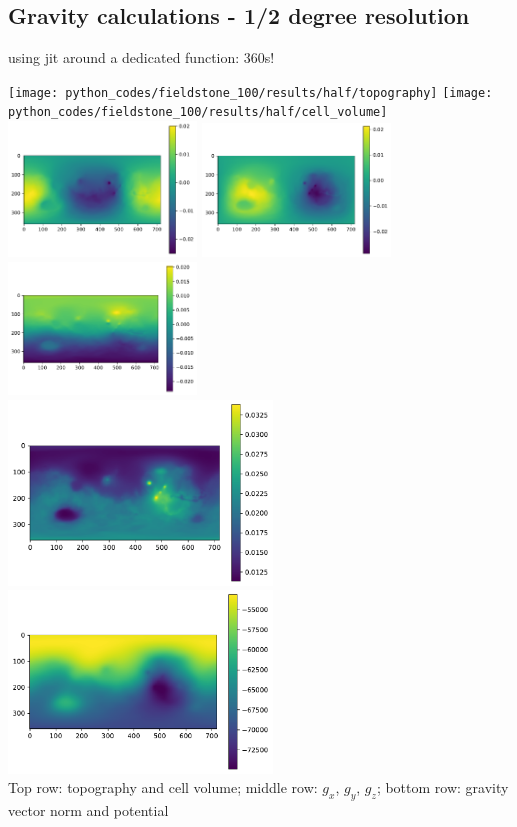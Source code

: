 \newpage
\subsection*{Gravity calculations - 1/2 degree resolution}

using jit around a dedicated function: 360s!

\begin{center}
\texttt{[image: python\_codes/fieldstone\_100/results/half/topography]}
\texttt{[image: python\_codes/fieldstone\_100/results/half/cell\_volume]}\\
\includegraphics[width=5cm]{python_codes/fieldstone_100/results/half/gx}
\includegraphics[width=5cm]{python_codes/fieldstone_100/results/half/gy}
\includegraphics[width=5cm]{python_codes/fieldstone_100/results/half/gz}\\
\includegraphics[width=7cm]{python_codes/fieldstone_100/results/half/gg}
\includegraphics[width=7cm]{python_codes/fieldstone_100/results/half/UU}\\
{\captionfont Top row: topography and cell volume; middle row: $g_x$, $g_y$, $g_z$;
bottom row: gravity vector norm and potential}
\end{center}


